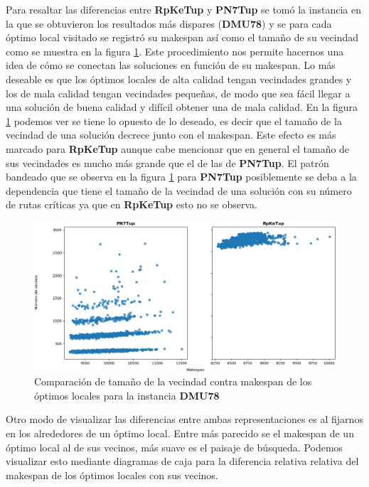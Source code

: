 Para resaltar las diferencias entre \textbf{RpKeTup} y \textbf{PN7Tup} se tomó la instancia en la que se obtuvieron los resultados más dispares (\textbf{DMU78}) y se para cada óptimo local visitado se registró su makespan así como el tamaño de su vecindad como se muestra en la figura \ref{fig:mattgraph}. Este procedimiento nos permite hacernos una idea de cómo se conectan las soluciones en función de su makespan. Lo más deseable es que los óptimos locales de alta calidad tengan vecindades grandes y los de mala calidad tengan vecindades pequeñas, de modo que sea fácil llegar a una solución de buena calidad y difícil obtener una de mala calidad. En la figura \ref{fig:mattgraph} podemos ver se tiene lo opuesto de lo deseado, es decir que el tamaño de la vecindad de una solución decrece junto con el makespan. Este efecto es más marcado para \textbf{RpKeTup} aunque cabe mencionar que en general el tamaño de sus vecindades es mucho más grande que el de las de \textbf{PN7Tup}. El patrón bandeado que se observa en la figura \ref{fig:mattgraph} para \textbf{PN7Tup} posiblemente se deba a la dependencia que tiene el tamaño de la vecindad de una solución con su número de rutas críticas ya que en \textbf{RpKeTup} esto no se observa.

\begin{figure}[hbtp]
    \includegraphics[scale=.6]{Imagenes/compvec78.png}
    \caption{Comparación de tamaño de la vecindad contra makespan de los óptimos locales para la instancia \textbf{DMU78} }
    \label{fig:mattgraph}
\end{figure}

Otro modo de visualizar las diferencias entre ambas representaciones es al fijarnos en los alrededores de un óptimo local. Entre más parecido se el makespan de un óptimo local al de sus vecinos, más suave es el paisaje de búsqueda. Podemos visualizar esto mediante diagramas de caja para la diferencia relativa relativa del makespan de los óptimos locales con sus vecinos. 

